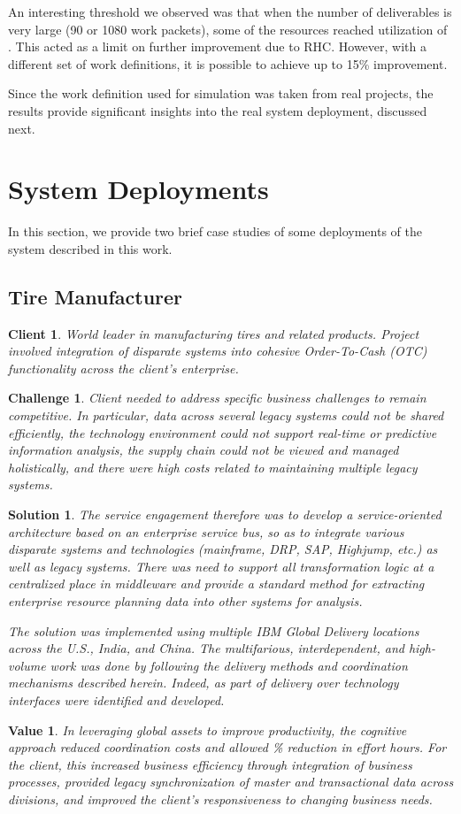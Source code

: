 \documentclass[10pt,journal,cspaper,compsoc]{IEEEtran}
\newtheorem{client}{Client}
\newtheorem{challenge}{Challenge}
\newtheorem{solution}{Solution}
\newtheorem{val}{Value}
\begin{document}
An interesting threshold 
we observed was that when the number of deliverables is very large (90 or 1080 work packets), 
some of the resources reached utilization of . This acted as a limit on further 
improvement due to RHC. However, with a different set of work definitions, it is possible 
to achieve up to 15\% improvement. 

Since the work definition used for simulation was taken from 
real projects, the results provide significant insights into the real system deployment,
discussed next.

\section{System Deployments}
In this section, we provide two brief case studies of some deployments of the system described in this work.

\subsection{Tire Manufacturer}
\begin{client}
World leader in manufacturing tires and related products. Project involved integration of disparate systems into cohesive 
Order-To-Cash (OTC) functionality across the client's enterprise. 
\end{client}
\begin{challenge}
Client needed to address specific business challenges to remain competitive.  In particular,
data across several legacy systems could not be shared efficiently, the technology environment could 
not support real-time or predictive information analysis, the supply chain could not be viewed 
and managed holistically, and there were high costs related to maintaining multiple legacy systems.
\end{challenge}
\begin{solution}
The service engagement therefore was to develop a service-oriented architecture based on an enterprise service bus,
so as to integrate various disparate systems and technologies (mainframe, DRP, SAP, Highjump, etc.) as well as 
legacy systems.  There was need to support all transformation logic at a centralized place in middleware 
and provide a standard method for extracting enterprise resource planning data into other systems for analysis. 

The solution was implemented using multiple IBM Global Delivery locations across the U.S., India, and China.
The multifarious, interdependent, and high-volume work was done by following the delivery methods and coordination 
mechanisms described herein.  Indeed, as part of delivery over  technology interfaces were identified and 
developed. 
\end{solution}
\begin{val}
In leveraging global assets to improve productivity, the cognitive approach reduced coordination costs and allowed 
\% reduction in effort hours.  For the client, this increased business efficiency through integration of business processes,
provided legacy synchronization of master and transactional data across divisions, and improved the client's
responsiveness to changing business needs.
\end{val}
\end{document}
